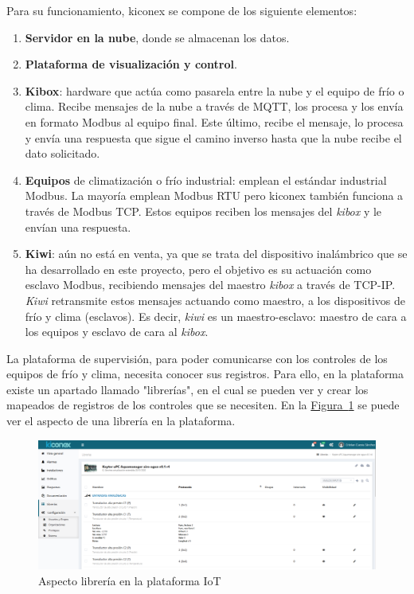 Para su funcionamiento, kiconex se compone de los siguiente elementos:
\begin{enumerate}
  \item \textbf{Servidor en la nube}, donde se almacenan los datos.
  \item \textbf{Plataforma de visualización y control}.  
  \item \textbf{Kibox}: hardware que actúa como pasarela entre la nube y el equipo de frío o clima. Recibe mensajes de la nube a través de MQTT, los procesa y los envía en formato Modbus al equipo final. Este último, recibe el mensaje, lo procesa y envía una respuesta que sigue el camino inverso hasta que la nube recibe el dato solicitado. 
  \item \textbf{Equipos} de climatización o frío industrial: emplean el estándar industrial Modbus. La mayoría emplean Modbus RTU pero kiconex también funciona a través de Modbus TCP. Estos equipos reciben los mensajes del \textit{kibox} y le envían una respuesta.
  \item \textbf{Kiwi}: aún no está en venta, ya que se trata del dispositivo inalámbrico que se ha desarrollado en este proyecto, pero el objetivo es su actuación como esclavo Modbus, recibiendo mensajes del maestro \textit{kibox} a través de TCP-IP. \textit{Kiwi} retransmite estos mensajes actuando como maestro, a los dispositivos de frío y clima (esclavos). Es decir, \textit{kiwi} es un maestro-esclavo: maestro de cara a los equipos y esclavo de cara al \textit{kibox}.
\end{enumerate}



La plataforma de supervisión, para poder comunicarse con los controles de los equipos de frío y clima, necesita conocer sus registros. Para ello, en la plataforma existe un apartado llamado "librerías", en el cual se pueden ver y crear los mapeados de registros de los controles que se necesiten. En la \hyperref[figura:libreriaPlataforma]{Figura~\ref{figura:libreriaPlataforma}} se puede ver el aspecto de una librería en la plataforma.

\begin{figure}[H]
  \centering
  \includegraphics[width=\textwidth, keepaspectratio]{img/libreriaKiconex}
  \caption{Aspecto librería en la plataforma IoT}
  \label{figura:libreriaPlataforma}
\end{figure}

